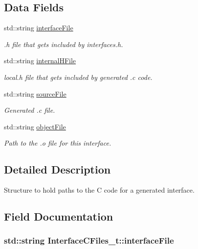 \subsection*{Data Fields}
\begin{DoxyCompactItemize}
\item 
std\+::string \hyperlink{struct_interface_c_files__t_abbab8a67e68a6950b89b4bcc04826ade}{interface\+File}
\begin{DoxyCompactList}\small\item\em .h file that gets included by interfaces.\+h. \end{DoxyCompactList}\item 
std\+::string \hyperlink{struct_interface_c_files__t_aa9ff4555c773489e312e18c79e37dfb7}{internal\+H\+File}
\begin{DoxyCompactList}\small\item\em local.\+h file that gets included by generated .c code. \end{DoxyCompactList}\item 
std\+::string \hyperlink{struct_interface_c_files__t_a50101efc16784932c133f9eda53da285}{source\+File}
\begin{DoxyCompactList}\small\item\em Generated .c file. \end{DoxyCompactList}\item 
std\+::string \hyperlink{struct_interface_c_files__t_a756a3d709f1e3e05c7132ce74942833d}{object\+File}
\begin{DoxyCompactList}\small\item\em Path to the .o file for this interface. \end{DoxyCompactList}\end{DoxyCompactItemize}


\subsection{Detailed Description}
Structure to hold paths to the C code for a generated interface. 

\subsection{Field Documentation}
\subsubsection[{\texorpdfstring{interface\+File}{interfaceFile}}]{\setlength{\rightskip}{0pt plus 5cm}std\+::string Interface\+C\+Files\+\_\+t\+::interface\+File}\hypertarget{struct_interface_c_files__t_abbab8a67e68a6950b89b4bcc04826ade}{}\label{struct_interface_c_files__t_abbab8a67e68a6950b89b4bcc04826ade}


